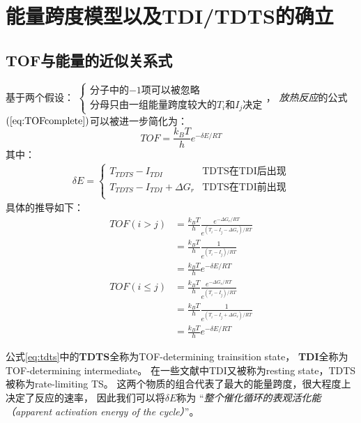 \documentclass[a4paper,titlepage]{article}
\begin{document}
\section*{能量跨度模型以及TDI/TDTS的确立}
\subsection*{TOF与能量的近似关系式}
基于两个假设：
$\begin{cases}
  \text{分子中的$-1$项可以被忽略}\\
  \text{分母只由一组能量跨度较大的$T_i$和$I_j$决定}
\end{cases}$，
\textit{放热反应}的公式$(\ref{eq:TOFcomplete})$可以被进一步简化为：
\begin{equation}\label{eq:TOFappro}
  TOF = \frac{k_BT}{h}e^{-\delta{E}/RT}
\end{equation}
其中：
\begin{equation}\label{eq:tdts}
  \begin{split}
    \delta{E}=
      \begin{cases}
        T_{TDTS}-I_{TDI}   & \text{TDTS在TDI后出现}\\
        T_{TDTS}-I_{TDI}+\Delta{G}_r  & \text{TDTS在TDI前出现}\\
      \end{cases}
  \end{split}
\end{equation}
具体的推导如下：
\begin{equation}
\begin{split}
  TOF(i>j)
  & = \frac{k_BT}{h}\frac{e^{-\Delta{G}_r/RT}}{e^{(T_i-I_j-\Delta{G}_r)/RT}}\\
  & = \frac{k_BT}{h}\frac{1}{e^{(T_i-I_j)/RT}}\\
  & = \frac{k_BT}{h}e^{-\delta{E}/RT}\\
  TOF(i\leq{}j) & = \frac{k_BT}{h}\frac{e^{-\Delta{G}_r/RT}}{e^{(T_i-I_j)/RT}}\\
  & = \frac{k_BT}{h}\frac{1}{e^{(T_i-I_j+\Delta{G}_r)/RT}}\\
  & = \frac{k_BT}{h}e^{-\delta{E}/RT}
\end{split}
\end{equation}

公式\ref{eq:tdts}中的\textbf{TDTS}全称为TOF-determining trainsition state，
\textbf{TDI}全称为TOF-determining intermediate。
在一些文献中TDI又被称为resting state，TDTS被称为rate-limiting TS。
这两个物质的组合代表了最大的能量跨度，很大程度上决定了反应的速率，
因此我们可以将$\delta{E}$称为
“\textit{整个催化循环的表观活化能（apparent activation energy of the cycle）}”。
\end{document}
